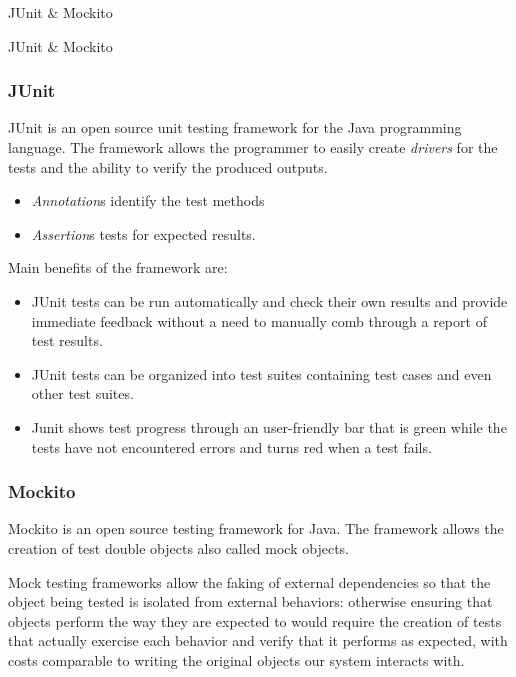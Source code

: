 \documentclass{beamer}
\begin{document}
\begin{section}{JUnit \& Mockito}
	\begin{subsection}{JUnit \& Mockito}
		
		\begin{frame}
			
			\frametitle{JUnit}
			{\small 
				JUnit is an open source unit testing framework for the Java programming language.
				The framework allows the programmer to easily create \textit{drivers} for the tests and the ability to verify the produced outputs. 
				\begin{itemize}
					
					\item \textit{Annotation}s identify the test methods 
					\item \textit{Assertion}s tests for expected results.
					
				\end{itemize}
				Main benefits of the framework are: \begin{itemize}
					\item JUnit tests can be run automatically and check their own results and provide immediate feedback without a need to manually comb through a report of test results.
					
					\item JUnit tests can be organized into test suites containing test cases and even other test suites.
					
					\item Junit shows test progress through an user-friendly bar that is green while the tests have not encountered errors and turns red when a test fails.
					
				\end{itemize}}
			\end{frame}
			\begin{frame}
				\frametitle{Mockito}
				{\small Mockito is an open source testing framework for Java. The framework allows the creation of test double objects also called mock objects.
					
					Mock testing frameworks allow the faking of external dependencies so that the object being tested is isolated from external behaviors: otherwise ensuring that objects perform the way they are expected to would require the creation of tests that actually exercise each behavior and verify that it performs as expected, with costs comparable to writing the original objects our system interacts with.
					
}
\end{frame}
\end{subsection}
\end{section}
\end{document}
